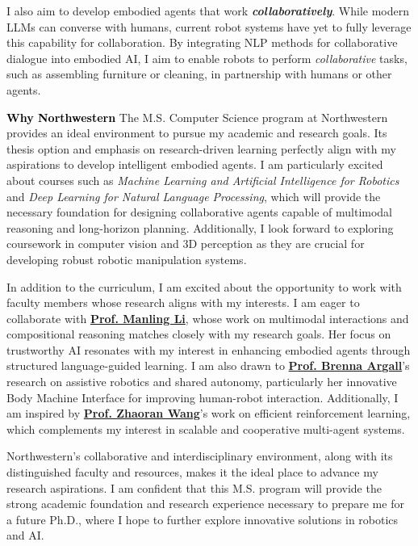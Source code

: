 \documentclass[11pt]{article}
\newcommand{\statement}[1]{\medskip\noindent
  \textcolor{black}{\textbf{#1}}\space
}
\begin{document}
\noindent I also aim to develop embodied agents that work \textbf{\textit{collaboratively}}. While modern LLMs can converse with humans, current robot systems have yet to fully leverage this capability for collaboration. By integrating NLP methods for collaborative dialogue into embodied AI, I aim to enable robots to perform \textit{collaborative} tasks, such as assembling furniture or cleaning, in partnership with humans or other agents.

\statement{Why Northwestern} The M.S. Computer Science program at Northwestern provides an ideal environment to pursue my academic and research goals. Its thesis option and emphasis on research-driven learning perfectly align with my aspirations to develop intelligent embodied agents. I am particularly excited about courses such as \textit{Machine Learning and Artificial Intelligence for Robotics} and \textit{Deep Learning for Natural Language Processing}, which will provide the necessary foundation for designing collaborative agents capable of multimodal reasoning and long-horizon planning. Additionally, I look forward to exploring coursework in computer vision and 3D perception as they are crucial for developing robust robotic manipulation systems.

\noindent In addition to the curriculum, I am excited about the opportunity to work with faculty members whose research aligns with my interests. I am eager to collaborate with \href{https://manlingli.github.io/}{\textbf{Prof. Manling Li}}, whose work on multimodal interactions and compositional reasoning matches closely with my research goals. Her focus on trustworthy AI resonates with my interest in enhancing embodied agents through structured language-guided learning. I am also drawn to \href{https://argallab.northwestern.edu/}{\textbf{Prof. Brenna Argall}}'s research on assistive robotics and shared autonomy, particularly her innovative Body Machine Interface for improving human-robot interaction. Additionally, I am inspired by \href{https://zhaoranwang.github.io/}{\textbf{Prof. Zhaoran Wang}}'s work on efficient reinforcement learning, which complements my interest in scalable and cooperative multi-agent systems.

\noindent Northwestern's collaborative and interdisciplinary environment, along with its distinguished faculty and resources, makes it the ideal place to advance my research aspirations. I am confident that this M.S. program will provide the strong academic foundation and research experience necessary to prepare me for a future Ph.D., where I hope to further explore innovative solutions in robotics and AI.
\end{document}
